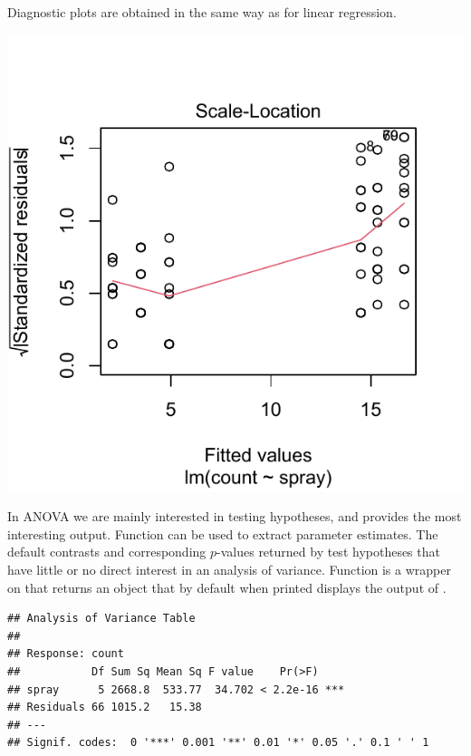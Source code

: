 \documentclass[krantz2]{krantz}\usepackage{knitr}
\begin{document}
Diagnostic plots are obtained in the same way as for linear regression.

\begin{knitrout}\footnotesize
{}\color{fgcolor}\begin{kframe}
\begin{alltt}
  \hlstd{=} \hlstd{)}
\end{alltt}
\end{kframe}

{\centering \includegraphics[width=.54\textwidth]{figure/pos-model-6a-1}

}



\end{knitrout}

In ANOVA we are mainly interested in testing hypotheses, and  provides the most interesting output. Function  can be used to extract parameter estimates. The default contrasts and corresponding $p$-values returned by  test hypotheses that have little or no direct interest in an analysis of variance. Function  is a wrapper on  that returns an object that by default when printed displays the output of .

\begin{knitrout}\footnotesize
{}\color{fgcolor}\begin{kframe}
\begin{alltt}
\end{alltt}
\begin{verbatim}
## Analysis of Variance Table
##
## Response: count
##           Df Sum Sq Mean Sq F value    Pr(>F)
## spray      5 2668.8  533.77  34.702 < 2.2e-16 ***
## Residuals 66 1015.2   15.38
## ---
## Signif. codes:  0 '***' 0.001 '**' 0.01 '*' 0.05 '.' 0.1 ' ' 1
\end{verbatim}
\end{kframe}
\end{knitrout}
\end{document}
